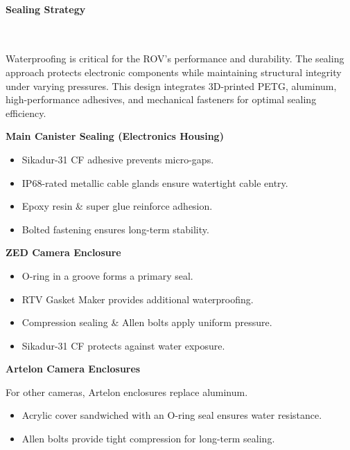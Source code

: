\vspace{-0.3cm}
\paragraph{Sealing Strategy} \ \\
\vspace{-0.5cm}

Waterproofing is critical for the ROV’s performance and durability. The sealing approach protects electronic components while maintaining structural integrity under varying pressures. This design integrates 3D-printed PETG, aluminum, high-performance adhesives, and mechanical fasteners for optimal sealing efficiency.

\vspace{0.2cm}
\textbf{Main Canister Sealing (Electronics Housing)}

\vspace{-0.5\baselineskip}
\begin{itemize}
    \setlength{\itemsep}{0pt}
    \item Sikadur-31 CF adhesive prevents micro-gaps.
    \item IP68-rated metallic cable glands ensure watertight cable entry.
    \item Epoxy resin \& super glue reinforce adhesion.
    \item Bolted fastening ensures long-term stability.
\end{itemize}

\textbf{ZED Camera Enclosure}

\vspace{-0.5\baselineskip}
\begin{itemize}
    \setlength{\itemsep}{0pt}
    \item O-ring in a groove forms a primary seal.
    \item RTV Gasket Maker provides additional waterproofing.
    \item Compression sealing \& Allen bolts apply uniform pressure.
    \item Sikadur-31 CF protects against water exposure.
    
\end{itemize}

\textbf{Artelon Camera Enclosures}

For other cameras, Artelon enclosures replace aluminum.

\vspace{-0.5\baselineskip}
\begin{itemize}
    \setlength{\itemsep}{0pt}
    \item Acrylic cover sandwiched with an O-ring seal ensures water resistance.
    \item Allen bolts provide tight compression for long-term sealing.
\end{itemize}

